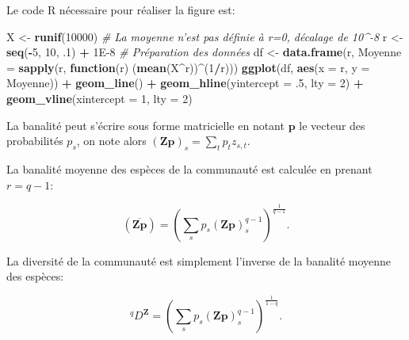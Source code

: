 \documentclass[
  11pt,
  french,
  a4paper,
  extrafontsizes,onecolumn,openright
  ]{memoir}
\newenvironment{Shaded}{\begin{snugshade}}{\end{snugshade}}
\newcommand{\CommentTok}[1]{\textcolor[rgb]{0.56,0.35,0.01}{\textit{#1}}}
\newcommand{\ControlFlowTok}[1]{\textcolor[rgb]{0.13,0.29,0.53}{\textbf{#1}}}
\newcommand{\DataTypeTok}[1]{\textcolor[rgb]{0.13,0.29,0.53}{#1}}
\newcommand{\DecValTok}[1]{\textcolor[rgb]{0.00,0.00,0.81}{#1}}
\newcommand{\FloatTok}[1]{\textcolor[rgb]{0.00,0.00,0.81}{#1}}
\newcommand{\KeywordTok}[1]{\textcolor[rgb]{0.13,0.29,0.53}{\textbf{#1}}}
\newcommand{\NormalTok}[1]{#1}
\newcommand{\OperatorTok}[1]{\textcolor[rgb]{0.81,0.36,0.00}{\textbf{#1}}}
\newcommand{\StringTok}[1]{\textcolor[rgb]{0.31,0.60,0.02}{#1}}
\begin{document}
Le code R nécessaire pour réaliser la figure est:

\scriptsize

\begin{Shaded}
\begin{Highlighting}[]
\NormalTok{X <-}\StringTok{ }\KeywordTok{runif}\NormalTok{(}\DecValTok{10000}\NormalTok{)}
\CommentTok{# La moyenne n'est pas définie à r=0, décalage de 10^-8}
\NormalTok{r <-}\StringTok{ }\KeywordTok{seq}\NormalTok{(}\OperatorTok{-}\DecValTok{5}\NormalTok{, }\DecValTok{10}\NormalTok{, }\FloatTok{.1}\NormalTok{) }\OperatorTok{+}\StringTok{ }\FloatTok{1E-8}
\CommentTok{# Préparation des données}
\NormalTok{df <-}\StringTok{ }\KeywordTok{data.frame}\NormalTok{(r, }\DataTypeTok{Moyenne =} \KeywordTok{sapply}\NormalTok{(r, }\ControlFlowTok{function}\NormalTok{(r) (}\KeywordTok{mean}\NormalTok{(X}\OperatorTok{^}\NormalTok{r))}\OperatorTok{^}\NormalTok{(}\DecValTok{1}\OperatorTok{/}\NormalTok{r)))}
\KeywordTok{ggplot}\NormalTok{(df, }\KeywordTok{aes}\NormalTok{(}\DataTypeTok{x =}\NormalTok{ r, }\DataTypeTok{y =}\NormalTok{ Moyenne)) }\OperatorTok{+}
\StringTok{  }\KeywordTok{geom_line}\NormalTok{() }\OperatorTok{+}
\StringTok{  }\KeywordTok{geom_hline}\NormalTok{(}\DataTypeTok{yintercept =} \FloatTok{.5}\NormalTok{, }\DataTypeTok{lty =} \DecValTok{2}\NormalTok{) }\OperatorTok{+}
\StringTok{  }\KeywordTok{geom_vline}\NormalTok{(}\DataTypeTok{xintercept =} \DecValTok{1}\NormalTok{, }\DataTypeTok{lty =} \DecValTok{2}\NormalTok{)}
\end{Highlighting}
\end{Shaded}

\normalsize

La banalité peut s'écrire sous forme matricielle en notant \(\mathbf{p}\) le vecteur des probabilités \(p_s\), on note alors \({\left(\mathbf{Zp}\right)}_s=\sum_t{p_{t}z_{s,t}}\).

La banalité moyenne des espèces de la communauté est calculée en prenant \(r=q-1\):

\begin{equation}
  \label{eq:barZp}
  \left(\overline{{\mathbf{Zp}}}\right)
  = {\left(\sum_s{p_s{\left(\mathbf{Zp}\right)}^{q-1}_s}\right)}^{\frac{1}{q-1}}.
\end{equation}

La diversité de la communauté est simplement l'inverse de la banalité moyenne des espèces:

\begin{equation}
  \label{eq:Dqz}
  ^q\!D^{\mathbf{Z}}={\left(\sum_s{p_s{\left(\mathbf{Zp}\right)}^{q-1}_s}\right)}^{\frac{1}{1-q}}.
\end{equation}
\end{document}

